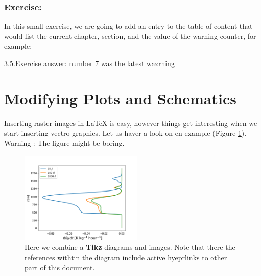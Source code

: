 \documentclass[a4paper,10pt]{report} %
\begin{document}
\subsubsection{Exercise:}
In this small exercise, we are going to add an entry to the table of content that would list the current chapter, section, and the value of the warning counter, for example:\\

\begin{center}
 3.5.Exercise answer: number 7 was the latest wazrning 
\end{center}




\newpage 
 \section{Modifying Plots and Schematics}\label{sec:figures}
 
 Inserting raster images in LaTeX is easy, however things get interesting when we start inserting vectro graphics. Let us haver a look on en example (Figure \ref{fig:figures}). Warning :  The figure might be boring.\\
 \begin{figure}[!ht] 
     \includegraphics[width=0.52\textwidth]{./figures/prof_tend.pdf}
        \caption[Diagrams and plots]{Here we combine a \textbf{Tikz} diagrams and images. Note that there the references withtin the diagram include active hyeprlinks to other part of this document.}    
      \label{fig:figures}    
 \end{figure}
 
\end{document}
